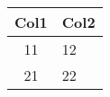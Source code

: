 \begin{table}[!t]
\label{tab:label}
\begin{center}
\begin{tabular}{|c|p{3.3cm}|}
\hline
Col1 & Col2
\tabularnewline
\hline
11   & 12
\tabularnewline
\hline
21   & 22
\tabularnewline
\hline
\end{tabular}
\end{center}
\end{table}
